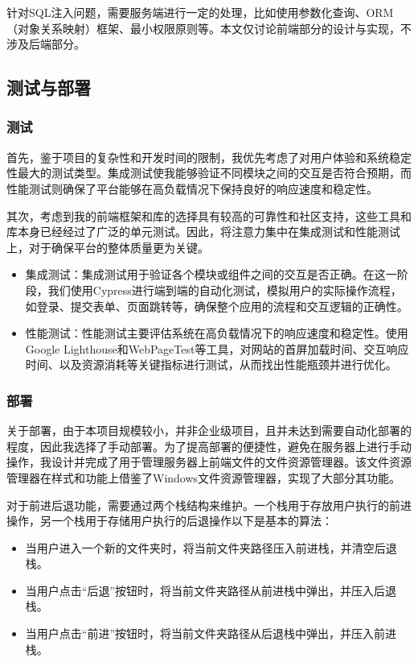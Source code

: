 \documentclass[12pt,a4paper]{article}
\begin{document}
\begin{CJK*}{UTF8}{gbsn}
针对SQL注入问题，需要服务端进行一定的处理，比如使用参数化查询、ORM（对象关系映射）框架、最小权限原则等。本文仅讨论前端部分的设计与实现，不涉及后端部分。

\subsection{测试与部署}
\subsubsection{测试}
首先，鉴于项目的复杂性和开发时间的限制，我优先考虑了对用户体验和系统稳定性最大的测试类型。集成测试使我能够验证不同模块之间的交互是否符合预期，而性能测试则确保了平台能够在高负载情况下保持良好的响应速度和稳定性。

其次，考虑到我的前端框架和库的选择具有较高的可靠性和社区支持，这些工具和库本身已经经过了广泛的单元测试。因此，将注意力集中在集成测试和性能测试上，对于确保平台的整体质量更为关键。

\begin{itemize}
    \item 集成测试：集成测试用于验证各个模块或组件之间的交互是否正确。在这一阶段，我们使用Cypress进行端到端的自动化测试，模拟用户的实际操作流程，如登录、提交表单、页面跳转等，确保整个应用的流程和交互逻辑的正确性。
    \item 性能测试：性能测试主要评估系统在高负载情况下的响应速度和稳定性。使用Google Lighthouse和WebPageTest等工具，对网站的首屏加载时间、交互响应时间、以及资源消耗等关键指标进行测试，从而找出性能瓶颈并进行优化。
\end{itemize}
\subsubsection{部署}
关于部署，由于本项目规模较小，并非企业级项目，且并未达到需要自动化部署的程度，因此我选择了手动部署。为了提高部署的便捷性，避免在服务器上进行手动操作，我设计并完成了用于管理服务器上前端文件的文件资源管理器。该文件资源管理器在样式和功能上借鉴了Windows文件资源管理器，实现了大部分其功能。

对于前进后退功能，需要通过两个栈结构来维护。一个栈用于存放用户执行的前进操作，另一个栈用于存储用户执行的后退操作以下是基本的算法：
\begin{itemize}
    \item 当用户进入一个新的文件夹时，将当前文件夹路径压入前进栈，并清空后退栈。
    \item 当用户点击“后退”按钮时，将当前文件夹路径从前进栈中弹出，并压入后退栈。
    \item 当用户点击“前进”按钮时，将当前文件夹路径从后退栈中弹出，并压入前进栈。
\end{itemize}


\end{CJK*}
\end{document}
